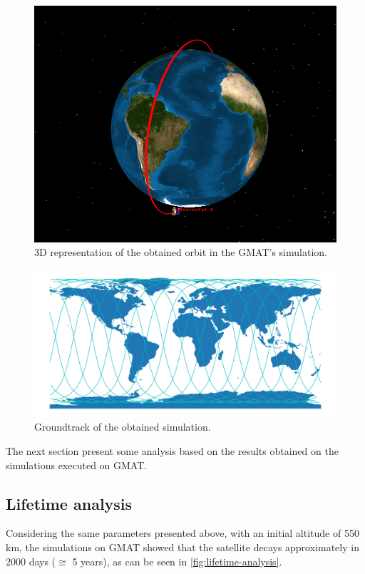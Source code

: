 \begin{figure}[!ht]
    \begin{center}
        \includegraphics[width=0.6\columnwidth]{figures/fsat2-gmat.png}
        \caption{3D representation of the obtained orbit in the GMAT's simulation.}
        \label{fig:fsat2-gmat}
    \end{center}
\end{figure}

\begin{figure}[!ht]
    \begin{center}
        \includegraphics[width=\columnwidth]{figures/fsat2-gmat-groundtrack.pdf}
        \caption{Groundtrack of the obtained simulation.}
        \label{fig:fsat2-gmat-groundtrack}
    \end{center}
\end{figure}

The next section present some analysis based on the results obtained on the simulations executed on GMAT.

\subsection{Lifetime analysis}

Considering the same parameters presented above, with an initial altitude of 550 km, the simulations on GMAT showed that the satellite decays approximately in 2000 days ($\cong$ 5 years), as can be seen in \autoref{fig:lifetime-analysis}.

